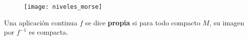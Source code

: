 \begin{figure}[h]
  	\centering
  	\texttt{[image: niveles\_morse]}
  	\label{fig:niveles_morse}
\end{figure}

\begin{definicion} Una aplicación continua $f$ se dice \textbf{propia} si para todo compacto $M$, su imagen por $f^{-1}$ es compacta.
\end{definicion}

\endinput
